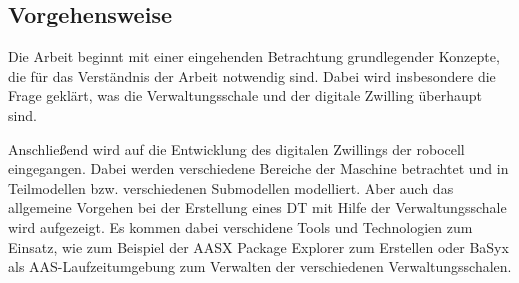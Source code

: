 \subsection{Vorgehensweise}
Die Arbeit beginnt mit einer eingehenden Betrachtung grundlegender Konzepte, die für das Verständnis der Arbeit notwendig sind. 
Dabei wird insbesondere die Frage geklärt, was die Verwaltungsschale und der digitale Zwilling überhaupt sind.

Anschließend wird auf die Entwicklung des digitalen Zwillings der robocell eingegangen. 
Dabei werden verschiedene Bereiche der Maschine betrachtet und in Teilmodellen bzw. verschiedenen Submodellen modelliert.
Aber auch das allgemeine Vorgehen bei der Erstellung eines DT mit Hilfe der Verwaltungsschale wird aufgezeigt.
Es kommen dabei verschidene Tools und Technologien zum Einsatz, wie zum Beispiel der AASX Package Explorer zum Erstellen oder BaSyx als AAS-Laufzeitumgebung zum Verwalten der verschiedenen Verwaltungsschalen.
